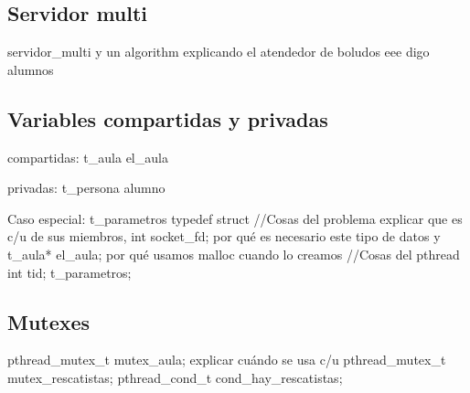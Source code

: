 \subsection{Servidor multi} %
servidor_multi y un algorithm explicando el atendedor de boludos eee digo alumnos 

\subsection{Variables compartidas y privadas}
compartidas: t_aula el_aula

privadas: t_persona alumno

Caso especial: t_parametros 
typedef struct {
	//Cosas del problema			explicar que es c/u de sus miembros,
	int socket_fd;				por qué es necesario este tipo de datos y
	t_aula* el_aula;			por qué usamos malloc cuando lo creamos
	//Cosas del pthread
	int tid;
} t_parametros;

\subsection{Mutexes}
pthread_mutex_t mutex_aula;			explicar cuándo se usa c/u
pthread_mutex_t mutex_rescatistas;
pthread_cond_t cond_hay_rescatistas;

